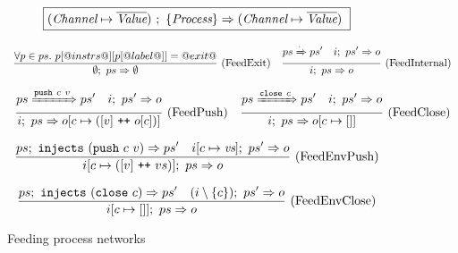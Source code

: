 
\begin{figure}

\newcommand\vs {\ti{vs}}
\newcommand\ps {\ti{ps}}

$$
  \boxed{
    (\textit{Channel} \mapsto \overline{\textit{Value}})~;~\{ \textit{Process} \} \Rightarrow (\textit{Channel} \mapsto \overline{\textit{Value}})~
  }
$$

$$
\enskip \frac {\displaystyle 
  \forall p \in ps.~
  p[@instrs@][p[@label@]] = @exit@
} {\displaystyle 
  \emptyset;~ps \Rightarrow \emptyset
} \  \mbox{(FeedExit)} \enskip
\enskip \frac {\displaystyle 
  ps \xRightarrow{\cdot} ps'
\quad
  i;~ps' \Rightarrow o
} {\displaystyle 
  i;~ps \Rightarrow o
} \  \mbox{(FeedInternal)} \enskip
$$

$$
\enskip \frac {\displaystyle 
  ps \xRightarrow{\texttt{push}~c~v} ps'
\quad
  i;~ps' \Rightarrow o
} {\displaystyle 
  i;~ps \Rightarrow o[c \mapsto ([v] ~\texttt{++}~ o[c])]
} \  \mbox{(FeedPush)} \enskip
\enskip \frac {\displaystyle 
  ps \xRightarrow{\texttt{close}~c} ps'
\quad
  i;~ps' \Rightarrow o
} {\displaystyle 
  i;~ps \Rightarrow o[c \mapsto []]
} \  \mbox{(FeedClose)} \enskip
$$





$$
\ruleIN{
  \ProcsInject
    {ps}
    {(\Push~c~v)}
    {ps'}
\quad
  \ProcsFeed
    {i[c \mapsto \vs]}
    {ps'}
    {o}
}{
  \ProcsFeed
    {i[c \mapsto ([v] \listappend vs)]}
    {ps}
    {o}
}{FeedEnvPush}
$$

$$
\enskip \frac {\displaystyle 
  ps;~\texttt{injects}~(\texttt{close}~c) \Rightarrow ps'
\quad
  (i\setminus\{ c \});~ps' \Rightarrow o
} {\displaystyle 
  i[c \mapsto [] ];~ps \Rightarrow o
} \  \mbox{(FeedEnvClose)} \enskip
$$



\caption{Feeding process networks}
\label{fig:Process:Eval:Feed}
\end{figure}

